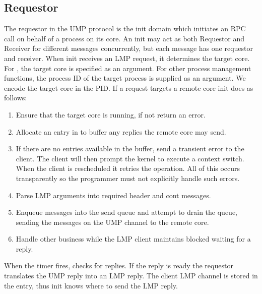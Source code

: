 \subsection{Requestor}
\label{sec:requestor}
The requestor in the UMP protocol is the init domain which initiates an RPC call on behalf of a process on 
its core. An init may act as both Requestor and Receiver for different messages concurrently, but each message
has one requestor and receiver. \newline \newline
\noindent When init receives an LMP request, it determines the target core. For , the 
target core is specified as an argument. For other process management functions, the process ID of the 
target process is supplied as an argument. We encode the target core in the PID. If a request targets a remote 
core init does as follows:
\begin{enumerate}
    \item Ensure that the target core is running, if not return an error.
    \item Allocate an entry in  to buffer any replies the remote core may send.
    \item If there are no entries available in the buffer, send a transient error to the client. The client will
    then prompt the kernel to execute a context switch. When the client is rescheduled it retries the operation. All of this
    occurs transparently so the programmer must not explicitly handle such errors.
    \item Parse LMP arguments into required header and cont messages.
    \item Enqueue messages into the send queue and attempt to drain the queue, sending the messages on the UMP channel to the remote core.
    \item Handle other business while the LMP client maintains blocked waiting for a reply.
\end{enumerate}
When the timer fires,  checks for replies. If the reply is ready the requestor translates
the UMP reply into an LMP reply. The client LMP channel is stored in the  entry, thus init
knows where to send the LMP reply.

